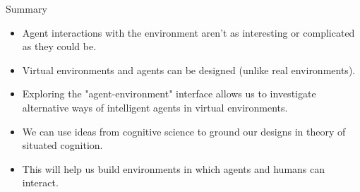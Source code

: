 \documentclass[aspectratio=1610,xcolor=dvipsnames,t]{beamer}
\begin{document}
\begin{frame}{Summary}
    \begin{itemize}
        \item Agent interactions with the environment aren't
              as interesting or complicated as they could be.
        \item Virtual environments and agents can be designed
              (unlike real environments).
        \item Exploring the "agent-environment" interface allows
              us to investigate alternative ways of intelligent
              agents in virtual environments.
        \item We can use ideas from cognitive science to  
              ground our designs in theory of situated cognition.
        \item This will help us build environments in which agents
              and humans can interact. 
    \end{itemize}
\end{frame} 
\end{document}
